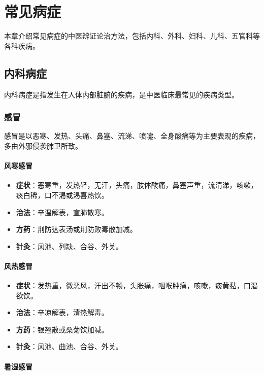 \documentclass[12pt,UTF8]{ctexbook}
\begin{document}
\chapter{常见病症}

本章介绍常见病症的中医辨证论治方法，包括内科、外科、妇科、儿科、五官科等各科疾病。

\section{内科病症}

内科病症是指发生在人体内部脏腑的疾病，是中医临床最常见的疾病类型。

\subsection{感冒}

感冒是以恶寒、发热、头痛、鼻塞、流涕、喷嚏、全身酸痛等为主要表现的疾病，多由外邪侵袭肺卫所致。

\subsubsection{风寒感冒}

\begin{itemize}
\item \textbf{症状}：恶寒重，发热轻，无汗，头痛，肢体酸痛，鼻塞声重，流清涕，咳嗽，痰白稀，口不渴或渴喜热饮。
\item \textbf{治法}：辛温解表，宣肺散寒。
\item \textbf{方药}：荆防达表汤或荆防败毒散加减。
\item \textbf{针灸}：风池、列缺、合谷、外关。
\end{itemize}

\subsubsection{风热感冒}

\begin{itemize}
\item \textbf{症状}：发热重，微恶风，汗出不畅，头胀痛，咽喉肿痛，咳嗽，痰黄黏，口渴欲饮。
\item \textbf{治法}：辛凉解表，清热解毒。
\item \textbf{方药}：银翘散或桑菊饮加减。
\item \textbf{针灸}：风池、曲池、合谷、外关。
\end{itemize}

\subsubsection{暑湿感冒}
\end{document}

